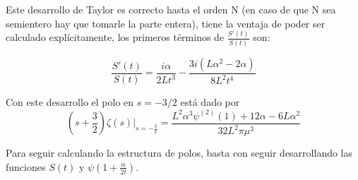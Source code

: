 Este desarrollo de Taylor es correcto hasta el orden N (en caso de que N sea semientero hay que tomarle la parte entera), tiene la ventaja de poder ser calculado explícitamente, los primeros términos de $\frac{S'(t)}{S(t)}$ son:

\begin{equation}
\frac{S'(t)}{S(t)} = 
\frac{i \alpha}{2 L t^3} -
\frac{3 i (L \alpha ^2 - 2 \alpha)}{8 L^2 t ^4}
\end{equation}




Con este desarrollo el polo en $s=-3/2$ está dado por 
\begin{equation}
\left( s+ \frac{3}{2} \right)
\zeta  (s) |_{s = - \frac{3}{2}}= 
\frac{L ^2 \alpha  ^3 \psi ^{(2)} (1) + 12   \alpha  - 6 L \alpha ^2}{32 L^2 \pi \mu ^3}
\end{equation}

Para seguir calculando la estructura de polos, basta con seguir desarrollando las funciones $S(t)$ y $\psi (1 + \frac{\alpha}{2 t})$.

